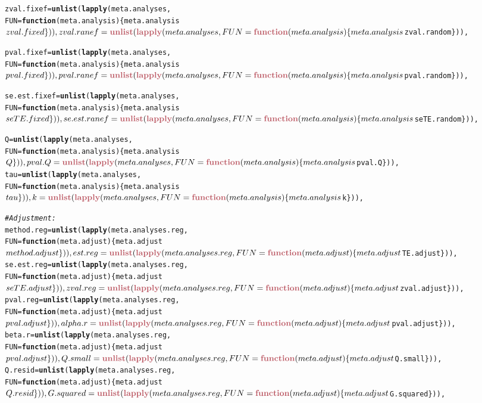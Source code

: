 \documentclass[11pt,a4paper,twoside]{book}\usepackage[]{graphicx}\usepackage[]{color}
\makeatletter
\newcommand{\hlcom}[1]{\textcolor[rgb]{0.678,0.584,0.686}{\textit{#1}}}%
\newcommand{\hlkwd}[1]{\textcolor[rgb]{0.737,0.353,0.396}{\textbf{#1}}}%
\newenvironment{kframe}{%
 \def\at@end@of@kframe{}%
 \ifinner\ifhmode%
  \def\at@end@of@kframe{\end{minipage}}%
  \begin{minipage}{\columnwidth}%
 \fi\fi%
 \def\FrameCommand##1{\hskip\@totalleftmargin \hskip-\fboxsep
 \colorbox{shadecolor}{##1}\hskip-\fboxsep
     \hskip-\linewidth \hskip-\@totalleftmargin \hskip\columnwidth}%
 \MakeFramed {\advance\hsize-\width
   \@totalleftmargin\z@ \linewidth\hsize
   \@setminipage}}%
 {\par\unskip\endMakeFramed%
 \at@end@of@kframe}
\newenvironment{knitrout}{}{} %
\makeatother
\begin{document}
\begin{knitrout}
\begin{kframe}
\begin{alltt}
  zval.fixef = \hlkwd{unlist}(\hlkwd{lapply}(meta.analyses, 
    FUN = \hlkwd{function}(meta.analysis)\{meta.analysis$zval.fixed\})),
  zval.ranef = \hlkwd{unlist}(\hlkwd{lapply}(meta.analyses, 
    FUN = \hlkwd{function}(meta.analysis)\{meta.analysis$zval.random\})),
  
  pval.fixef = \hlkwd{unlist}(\hlkwd{lapply}(meta.analyses, 
    FUN = \hlkwd{function}(meta.analysis)\{meta.analysis$pval.fixed\})),
  pval.ranef = \hlkwd{unlist}(\hlkwd{lapply}(meta.analyses, 
    FUN = \hlkwd{function}(meta.analysis)\{meta.analysis$pval.random\})),
  
  se.est.fixef =  \hlkwd{unlist}(\hlkwd{lapply}(meta.analyses, 
    FUN = \hlkwd{function}(meta.analysis)\{meta.analysis$seTE.fixed\})),
  se.est.ranef =  \hlkwd{unlist}(\hlkwd{lapply}(meta.analyses, 
    FUN = \hlkwd{function}(meta.analysis)\{meta.analysis$seTE.random\})),
  
  Q = \hlkwd{unlist}(\hlkwd{lapply}(meta.analyses, 
    FUN = \hlkwd{function}(meta.analysis)\{meta.analysis$Q\})),
  pval.Q = \hlkwd{unlist}(\hlkwd{lapply}(meta.analyses, 
    FUN = \hlkwd{function}(meta.analysis)\{meta.analysis$pval.Q\})),
  tau = \hlkwd{unlist}(\hlkwd{lapply}(meta.analyses, 
    FUN = \hlkwd{function}(meta.analysis)\{meta.analysis$tau\})),
  k = \hlkwd{unlist}(\hlkwd{lapply}(meta.analyses, 
    FUN = \hlkwd{function}(meta.analysis)\{meta.analysis$k\})),
  
\hlcom{  #Adjustment:}
  method.reg = \hlkwd{unlist}(\hlkwd{lapply}(meta.analyses.reg, 
    FUN = \hlkwd{function}(meta.adjust)\{meta.adjust$method.adjust\})),
  est.reg = \hlkwd{unlist}(\hlkwd{lapply}(meta.analyses.reg, 
    FUN = \hlkwd{function}(meta.adjust)\{meta.adjust$TE.adjust\})),
  se.est.reg = \hlkwd{unlist}(\hlkwd{lapply}(meta.analyses.reg, 
    FUN = \hlkwd{function}(meta.adjust)\{meta.adjust$seTE.adjust\})),
  zval.reg = \hlkwd{unlist}(\hlkwd{lapply}(meta.analyses.reg, 
    FUN = \hlkwd{function}(meta.adjust)\{meta.adjust$zval.adjust\})),
  pval.reg = \hlkwd{unlist}(\hlkwd{lapply}(meta.analyses.reg, 
    FUN = \hlkwd{function}(meta.adjust)\{meta.adjust$pval.adjust\})),
  alpha.r = \hlkwd{unlist}(\hlkwd{lapply}(meta.analyses.reg, 
    FUN = \hlkwd{function}(meta.adjust)\{meta.adjust$pval.adjust\})),
  beta.r = \hlkwd{unlist}(\hlkwd{lapply}(meta.analyses.reg, 
    FUN = \hlkwd{function}(meta.adjust)\{meta.adjust$pval.adjust\})),
  Q.small = \hlkwd{unlist}(\hlkwd{lapply}(meta.analyses.reg, 
    FUN = \hlkwd{function}(meta.adjust)\{meta.adjust$Q.small\})),
  Q.resid = \hlkwd{unlist}(\hlkwd{lapply}(meta.analyses.reg, 
    FUN = \hlkwd{function}(meta.adjust)\{meta.adjust$Q.resid\})),
  G.squared = \hlkwd{unlist}(\hlkwd{lapply}(meta.analyses.reg, 
    FUN = \hlkwd{function}(meta.adjust)\{meta.adjust$G.squared\})),
  

\end{alltt}
\end{kframe}
\end{knitrout}
\end{document}

